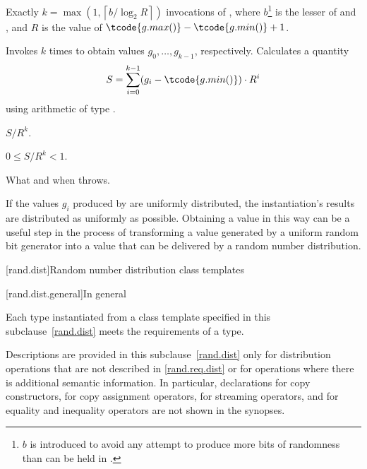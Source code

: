 \begin{itemdescr}
\pnum
\complexity
Exactly
 $k = \max(1, \left\lceil b / \log_2 R \right\rceil)$
 invocations
 of ,
 where $b$\footnote{$b$ is introduced
   to avoid any attempt
   to produce more bits of randomness
   than can be held in .}
   is the lesser of 
                and ,
 and
   $R$ is the value of $\tcode{g.max()} - \tcode{g.min()} + 1$.

\pnum
\effects
 Invokes  $k$ times
 to obtain values $g_0, \dotsc, g_{k-1}$, respectively.
 Calculates a quantity
 \[
   S = \sum_{i=0}^{k-1} (g_i - \tcode{g.min()})
                        \cdot R^i
 \]
 using arithmetic of type
 .

\pnum
\returns
$S / R^k$.
\begin{note}
$0 \leq S / R^k < 1$.
\end{note}

\pnum
\throws
What and when  throws.

\pnum
\begin{note}
If the values $g_i$ produced by  are uniformly distributed,
the instantiation's results are distributed as uniformly as possible.
Obtaining a value in this way
can be a useful step
in the process of transforming
a value generated by a uniform random bit generator
into a value
that can be delivered by a random number distribution.
\end{note}
\end{itemdescr}





[rand.dist]{Random number distribution class templates}%

[rand.dist.general]{In general}

\pnum
Each type instantiated
from a class template specified in this subclause~\ref{rand.dist}
meets the requirements
of a  type.

\pnum
Descriptions are provided in this subclause~\ref{rand.dist}
only for distribution operations
that are not described in \ref{rand.req.dist}
or for operations where there is additional semantic information.
In particular,
declarations for copy constructors,
for copy assignment operators,
for streaming operators,
and for equality and inequality operators
are not shown in the synopses.

